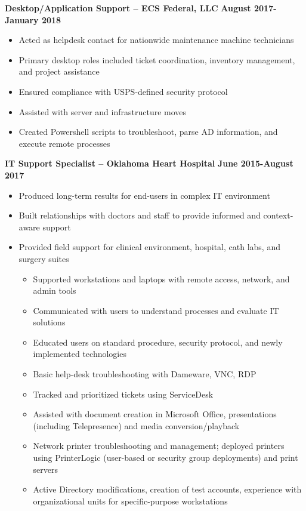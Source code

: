 \documentclass[line]{res}
\begin{document}
\begin{resume}
\begin{itemize}
\begin{itemize}
		\end{itemize}
\end{itemize}
\textbf{Desktop/Application Support -- ECS Federal, LLC}
\newline
\textbf{August 2017-January 2018}
	\begin{itemize}
		\item Acted as helpdesk contact for nationwide maintenance machine technicians
		\item Primary desktop roles included ticket coordination, inventory management, and project assistance
		\item Ensured compliance with USPS-defined security protocol
		\item Assisted with server and infrastructure moves
		\item Created Powershell scripts to troubleshoot, parse AD information, and execute remote processes
	\end{itemize}
\textbf{IT Support Specialist -- Oklahoma Heart Hospital}
\newline
\textbf{June 2015-August 2017}
	\begin{itemize}
		\item Produced long-term results for end-users in complex IT environment
		\item Built relationships with doctors and staff to provide informed and context-aware support
		\item Provided field support for clinical environment, hospital, cath labs, and surgery suites
			\begin{itemize}
				\item Supported workstations and laptops with remote access, network, and admin tools
				\item Communicated with users to understand processes and evaluate IT solutions
				\item Educated users on standard procedure, security protocol, and newly implemented technologies
				\item Basic help-desk troubleshooting with Dameware, VNC, RDP
				\item Tracked and prioritized tickets using ServiceDesk
				\item Assisted with document creation in Microsoft Office, presentations (including Telepresence) and media conversion/playback
				\item Network printer troubleshooting and management; deployed printers using PrinterLogic (user-based or security group deployments) and print servers
				\item Active Directory modifications, creation of test accounts, experience with organizational units for specific-purpose workstations

\end{itemize}
\end{itemize}
\end{resume}
\end{document}
